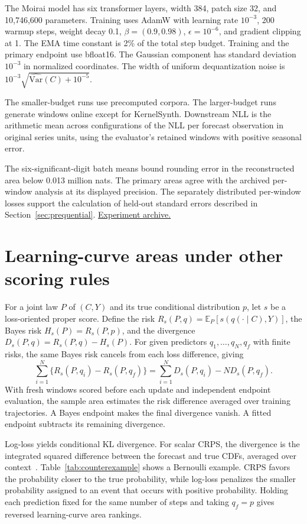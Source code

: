 \documentclass[10pt,a4paper]{article}
\theoremstyle{definition}
\begin{document}
The Moirai model has six transformer layers, width 384, patch size 32,
and 10,746,600 parameters. Training uses AdamW with learning rate
$10^{-3}$, 200 warmup steps, weight decay 0.1, $\beta=(0.9,0.98)$,
$\epsilon=10^{-6}$, and gradient clipping at 1. The EMA time constant is
2\% of the total step budget. Training and the primary endpoint use
bfloat16. The Gaussian component has standard deviation $10^{-3}$ in
normalized coordinates. The width of uniform dequantization noise is
$10^{-3}\sqrt{\widehat{\mathrm{Var}}(C)+10^{-5}}$.

The smaller-budget runs use precomputed corpora. The larger-budget runs
generate windows online except for KernelSynth. Downstream NLL is the
arithmetic mean across configurations of the NLL per forecast observation
in original series units, using the evaluator's retained windows with
positive seasonal error.

The six-significant-digit batch means bound rounding error in the
reconstructed area below 0.013 million nats. The primary areas agree with
the archived per-window analysis at its displayed precision. The
separately distributed per-window losses support the calculation of
held-out standard errors described in Section~\ref{sec:prequential}.
\href{https://github.com/intsystems/Epiplexity/tree/main/experiments/episynth}
{Experiment archive.}

\section{Learning-curve areas under other scoring rules}\label{sec:score-areas}
For a joint law $P$ of $(C,Y)$ and its true conditional distribution $p$,
let $s$ be a loss-oriented proper score. Define the risk
$R_s(P,q)=\mathbb E_P[s(q(\cdot\mid C),Y)]$, the Bayes risk
$H_s(P)=R_s(P,p)$, and the divergence $D_s(P,q)=R_s(P,q)-H_s(P)$.
For given predictors $q_1,\ldots,q_N,q_f$ with finite risks, the same
Bayes risk cancels from each loss difference, giving
\begin{equation}
 \sum_{i=1}^{N}\{R_s(P,q_i)-R_s(P,q_f)\}
 =\sum_{i=1}^{N}D_s(P,q_i)-N D_s(P,q_f).
 \label{eq:proper}
\end{equation}
With fresh windows scored before each update and independent endpoint
evaluation, the sample area estimates the risk difference averaged over
training trajectories. A Bayes endpoint makes the final divergence vanish.
A fitted endpoint subtracts its remaining divergence.

Log-loss yields conditional KL divergence. For scalar CRPS, the divergence
is the integrated squared difference between the forecast and true CDFs,
averaged over context~\cite{gneiting2007}. Table~\ref{tab:counterexample}
shows a Bernoulli example. CRPS favors the probability closer to the true
probability, while log-loss penalizes the smaller probability assigned to
an event that occurs with positive probability. Holding each prediction
fixed for the same number of steps and taking $q_f=p$ gives reversed
learning-curve area rankings.
\end{document}
